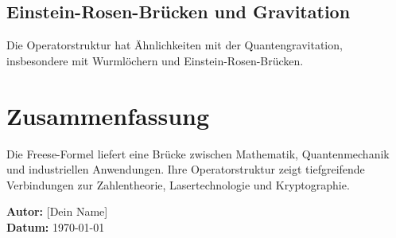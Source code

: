 \documentclass[a4paper,12pt]{article}
\begin{document}
\subsection{Einstein-Rosen-Brücken und Gravitation}
Die Operatorstruktur hat Ähnlichkeiten mit der Quantengravitation, insbesondere mit Wurmlöchern und Einstein-Rosen-Brücken.

\section{Zusammenfassung}
Die Freese-Formel liefert eine Brücke zwischen Mathematik, Quantenmechanik und industriellen Anwendungen. Ihre Operatorstruktur zeigt tiefgreifende Verbindungen zur Zahlentheorie, Lasertechnologie und Kryptographie.

\vfill
\textbf{Autor:} [Dein Name] \\
\textbf{Datum:} \today
\end{document}
